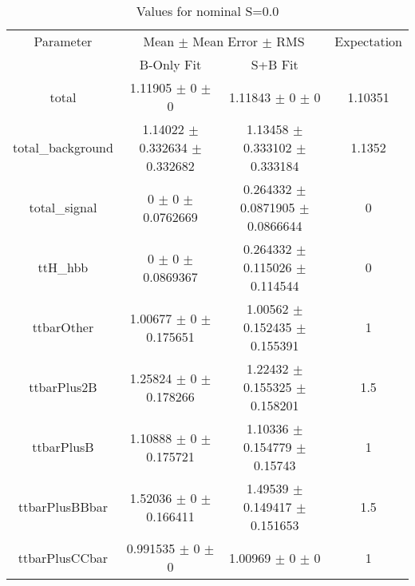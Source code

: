 \begin{table}
\centering
\caption{Values for nominal S=0.0}
\begin{tabular}{cccc}
\toprule
Parameter & \multicolumn{2}{c}{Mean $\pm$ Mean Error $\pm$ RMS} & Expectation\\
 & B-Only Fit & S+B Fit & \\
\midrule
total & \num{1.11905} $\pm$ \num{0} $\pm$ \num{0} & \num{1.11843} $\pm$ \num{0} $\pm$ \num{0} & \num{1.10351}\\
total\_background & \num{1.14022} $\pm$ \num{0.332634} $\pm$ \num{0.332682} & \num{1.13458} $\pm$ \num{0.333102} $\pm$ \num{0.333184} & \num{1.1352}\\
total\_signal & \num{0} $\pm$ \num{0} $\pm$ \num{0.0762669} & \num{0.264332} $\pm$ \num{0.0871905} $\pm$ \num{0.0866644} & \num{0}\\
ttH\_hbb & \num{0} $\pm$ \num{0} $\pm$ \num{0.0869367} & \num{0.264332} $\pm$ \num{0.115026} $\pm$ \num{0.114544} & \num{0}\\
ttbarOther & \num{1.00677} $\pm$ \num{0} $\pm$ \num{0.175651} & \num{1.00562} $\pm$ \num{0.152435} $\pm$ \num{0.155391} & \num{1}\\
ttbarPlus2B & \num{1.25824} $\pm$ \num{0} $\pm$ \num{0.178266} & \num{1.22432} $\pm$ \num{0.155325} $\pm$ \num{0.158201} & \num{1.5}\\
ttbarPlusB & \num{1.10888} $\pm$ \num{0} $\pm$ \num{0.175721} & \num{1.10336} $\pm$ \num{0.154779} $\pm$ \num{0.15743} & \num{1}\\
ttbarPlusBBbar & \num{1.52036} $\pm$ \num{0} $\pm$ \num{0.166411} & \num{1.49539} $\pm$ \num{0.149417} $\pm$ \num{0.151653} & \num{1.5}\\
ttbarPlusCCbar & \num{0.991535} $\pm$ \num{0} $\pm$ \num{0} & \num{1.00969} $\pm$ \num{0} $\pm$ \num{0} & \num{1}\\
\bottomrule
\end{tabular}
\end{table}